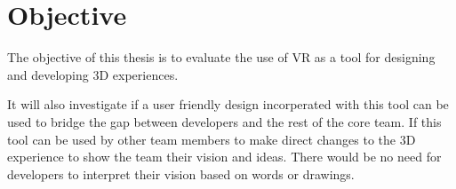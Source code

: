 \section{Objective}
The objective of this thesis is to evaluate the use of VR as a tool for designing and developing 3D experiences.

It will also investigate if a user friendly design incorperated with this tool can be used to bridge the gap between developers and the rest of the core team. If this tool  can be used by other team members to make direct changes to the 3D experience to show the team their vision and ideas. There would be no need for developers to interpret their vision based on words or drawings.
